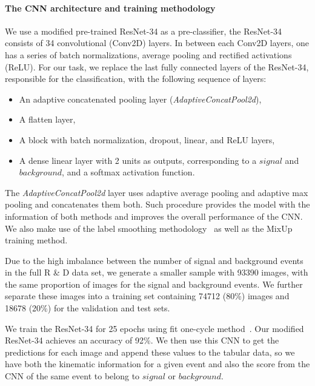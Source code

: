\documentclass[a4paper,11pt]{article}
\begin{document}
\paragraph{The CNN architecture and training methodology}
We use a modified pre-trained ResNet-34 as a pre-classifier, the ResNet-34 consists of 34 convolutional (Conv2D) layers. In between each Conv2D layers, one has a series of batch normalizations, average pooling and rectified activations (ReLU). For our task, we replace the last fully connected layers of the ResNet-34, responsible for the classification, with the following sequence of layers:
\begin{itemize}
\item  An adaptive concatenated pooling layer ({\it AdaptiveConcatPool2d}), 
\item  A flatten layer,
\item  A block with batch normalization, dropout, linear, and ReLU layers,
\item  A dense linear layer with 2 units as outputs, corresponding to a $signal$ and $background$, and a softmax activation function.
\end{itemize}
The {\it AdaptiveConcatPool2d} layer uses adaptive average pooling and adaptive max pooling and concatenates them both. Such procedure provides the model with the information of both methods and improves the overall performance of the CNN. We also make use of the label smoothing methodology~\cite{DBLP:journals/corr/SzegedyVISW15} as well as the MixUp~\cite{2017arXiv171009412Z} training method.

Due to the high imbalance between the number of signal and background events in the full R \& D data set, we generate a smaller sample with 93390 images, with the same proportion of images for the signal and background events. We further separate these images into a training set containing 74712 (80\%) images and 18678 (20\%) for the validation and test sets.

We train the ResNet-34 for 25 epochs using fit one-cycle method~\cite{2018arXiv180309820S}. Our modified ResNet-34 achieves an accuracy of  92\%. We then use this CNN to get the predictions for each image and append these values to the tabular data, so we have both the kinematic information for a given event and also the score from the CNN of the same event to belong to $signal$ or $background$.
\end{document}
